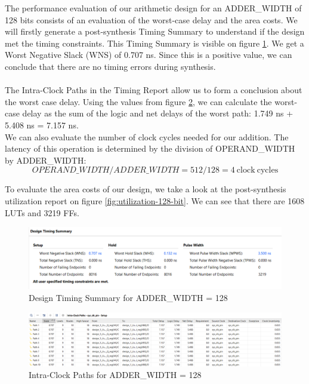 \documentclass[a4paper,kul]{kulakarticle} %
\begin{document}
The performance evaluation of our arithmetic design for an ADDER\_WIDTH of 128 bits consists of an evaluation of the worst-case delay and the area costs. We will firstly generate a post-synthesis Timing Summary to understand if the design met the timing constraints. This Timing Summary is visible on figure \ref{fig:timing-128-bit}. We get a Worst Negative Slack (WNS) of 0.707 ns. Since this is a positive value, we can conclude that there are no timing errors during synthesis.
\\\\
The Intra-Clock Paths in the Timing Report allow us to form a conclusion about the worst case delay. Using the values from figure \ref{fig:paths-128-bit}, we can calculate the worst-case delay as the sum of the logic and net delays of the worst path: 1.749 ns + 5.408 ns = 7.157 ns.
\\
We can also evaluate the number of clock cycles needed for our addition. The latency of this operation is determined by the division of OPERAND\_WIDTH by ADDER\_WIDTH:
\begin{equation}
	OPERAND\_WIDTH/ADDER\_WIDTH = 512/128 = 4 \mathrm{\ clock\ cycles}
\end{equation} 

To evaluate the area costs of our design, we take a look at the post-synthesis utilization report on figure \ref{fig:utilization-128-bit}. We can see that there are 1608 LUTs and 3219 FFs.  

\begin{figure}[h]
	\centering
	\includegraphics[width=0.75\linewidth]{images/timing-128-bit.png}
	\caption{Design Timing Summary for ADDER\_WIDTH = 128}
	\label{fig:timing-128-bit}
\end{figure}

\begin{figure}[h]
	\centering
	\includegraphics[width=0.75\linewidth]{images/paths-128-bit.png}
	\caption{Intra-Clock Paths for ADDER\_WIDTH = 128}
	\label{fig:paths-128-bit}
\end{figure}
\end{document}
